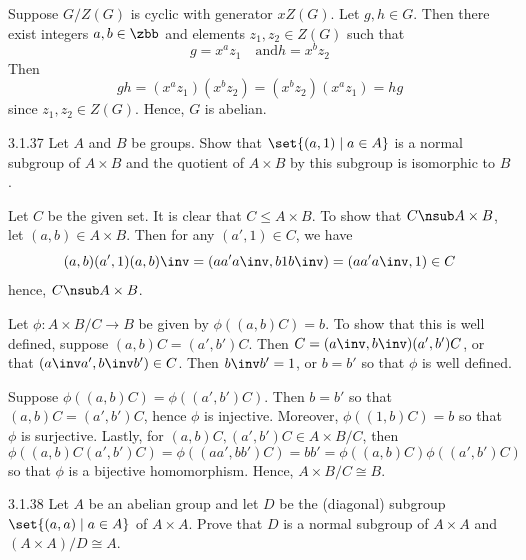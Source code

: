 \begin{sol}
    Suppose $G/Z(G)$ is cyclic with generator $xZ(G)$.
	Let $g, h \in G$.
	Then there exist integers $a, b \in \zbb$ and elements $z_1, z_2 \in Z(G)$ such that
    \[
    	g = x^a z_1 \quad \text{and} h = x^b z_2
    \]
    Then
    \[
    	gh = (x^a z_1)(x^b z_2) = (x^b z_2)(x^a z_1) = hg
    \]
    since $z_1, z_2 \in Z(G)$.
	Hence, $G$ is abelian.
\end{sol}

\begin{exercise}{3.1.37}
    Let $A$ and $B$ be groups.
	Show that $\set{(a,1) \mid a \in A}$ is a normal subgroup of $A \times B$ and the quotient of $A \times B$ by this subgroup is isomorphic to $B$.
\end{exercise}

\begin{sol}
    Let $C$ be the given set.
	It is clear that $C \leq A \times B$.
	To show that $C \nsub A \times B$, let $(a, b) \in A \times B$.
	Then for any $(a', 1) \in C$, we have
    \[
    	(a, b)(a', 1)(a, b)\inv = (aa'a\inv, b1b\inv) = (aa'a\inv, 1) \in C
    \]
    hence, $C \nsub A \times B$.

    Let $\phi \colon A \times B/C \to B$ be given by $\phi((a, b)C) = b$.
	To show that this is well defined, suppose $(a, b)C = (a', b')C$.
	Then $C = (a\inv, b\inv)(a', b')C$, or that $(a\inv a', b\inv b') \in C$.
	Then $b\inv b' = 1$, or $b = b'$ so that $\phi$ is well defined.

    Suppose $\phi((a, b)C) = \phi((a', b')C)$.
	Then $b = b'$ so that $(a, b)C = (a', b')C$, hence $\phi$ is injective.
	Moreover, $\phi((1, b)C) = b$ so that $\phi$ is surjective.
	Lastly, for $(a, b)C, (a', b')C \in A \times B/C$, then
    \[
    	\phi((a, b)C (a', b')C) = \phi((aa', bb')C) = bb' = \phi((a, b)C)\phi((a', b')C)
    \]
    so that $\phi$ is a bijective homomorphism.
	Hence, $A \times B/C \cong B$.
\end{sol}

\begin{exercise}{3.1.38}
    Let $A$ be an abelian group and let $D$ be the (diagonal) subgroup $\set{(a,a) \mid a \in A}$ of $A \times A$.
	Prove that $D$ is a normal subgroup of $A \times A$ and $(A \times A)/D \cong A$.
\end{exercise}

